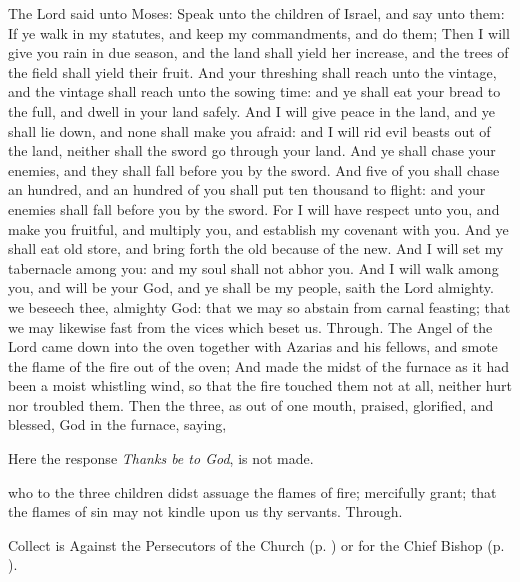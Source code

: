  The Lord said unto Moses: Speak unto the children of Israel, and say unto them: If ye walk in my statutes, and keep my commandments, and do them; Then I will give you rain in due season, and the land shall yield her increase, and the trees of the field shall yield their fruit. And your threshing shall reach unto the vintage, and the vintage shall reach unto the sowing time: and ye shall eat your bread to the full, and dwell in your land safely. And I will give peace in the land, and ye shall lie down, and none shall make you afraid: and I will rid evil beasts out of the land, neither shall the sword go through your land. And ye shall chase your enemies, and they shall fall before you by the sword. And five of you shall chase an hundred, and an hundred of you shall put ten thousand to flight: and your enemies shall fall before you by the sword. For I will have respect unto you, and make you fruitful, and multiply you, and establish my covenant with you. And ye shall eat old store, and bring forth the old because of the new. And I will set my tabernacle among you: and my soul shall not abhor you. And I will walk among you, and will be your God, and ye shall be my people, saith the Lord almighty.
\collect
{} we beseech thee, almighty God: that we may so abstain from carnal feasting; that we may likewise fast from the vices which beset us. Through.
 The Angel of the Lord came down into the oven together with Azarias and his fellows, and smote the flame of the fire out of the oven; And made the midst of the furnace as it had been a moist whistling wind, so that the fire touched them not at all, neither hurt nor troubled them. Then the three, as out of one mouth, praised, glorified, and blessed, God in the furnace, saying,
\begin{rubric}
    Here the response \emph{Thanks be to God}, is not made.
\end{rubric}
\collect
{} who to the three children didst assuage the flames of fire; mercifully grant; that the flames of sin may not kindle upon us thy servants. Through.
\begin{rubric}
     Collect is Against the Persecutors of the Church (p. \pageref{SPAgainst}) or for the Chief Bishop (p. \pageref{SPChiefBishop}).
\end{rubric}
